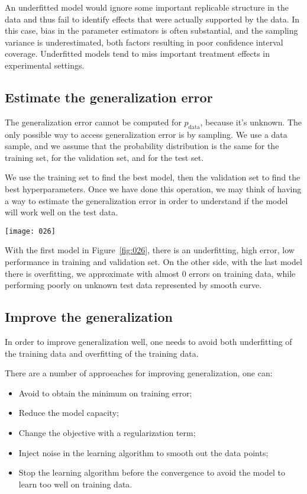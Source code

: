 An underfitted model would ignore some important replicable structure in the data and thus fail to identify effects that were actually supported by the data. In this case, bias in the parameter estimators is often substantial, and the sampling variance is underestimated, both factors resulting in poor confidence interval coverage. Underfitted models tend to miss important treatment effects in experimental settings.

\subsection{Estimate the generalization error}
The generalization error cannot be computed for \(p_{\text{data}}\), because it's unknown. The only possible way to access generalization error is by sampling. We use a data sample, and we assume that the probability distribution is the same for the training set, for the validation set, and for the test set.

We use the training set to find the best model, then the validation set to find the best hyperparameters. Once we have done this operation, we may think of having a way to estimate the generalization error in order to understand if the model will work well on the test data.

\begin{example}
\begin{center}
    \texttt{[image: 026]}
    \label{fig:026}
\end{center}
With the first model in Figure~\ref{fig:026}, there is an underfitting, high error, low performance in training and validation set. On the other side, with the last model there is overfitting, we approximate with almost 0 errors on training data, while performing poorly on unknown test data represented by smooth curve.

\end{example}

\subsection{Improve the generalization}
In order to improve generalization well, one needs to avoid both underfitting of the training data and overfitting of the training data.

There are a number of approeaches for improving generalization, one can:
\begin{itemize}
    \item
    Avoid to obtain the minimum on training error;
    \item
    Reduce the model capacity;
    \item
    Change the objective with a regularization term;
    \item
    Inject noise in the learning algorithm to smooth out the data points;
    \item
    Stop the learning algorithm before the convergence to avoid the model to learn too well on training data.
\end{itemize}

